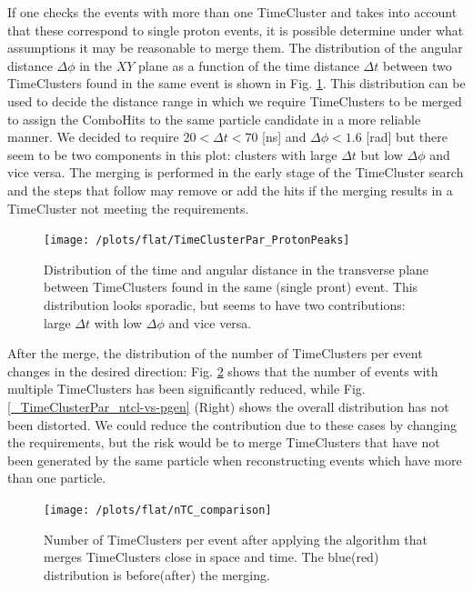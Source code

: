 \documentclass[12pt,a4paper,openright, oneside, titlepage]{book} %
\begin{document}
\noindent If one checks the events with more than one TimeCluster and takes into account that these correspond to single proton events, it is possible determine under what assumptions it may be reasonable to merge them. 
The distribution of the angular distance $\Delta \phi$ in the $XY$ plane as a function of the time distance $\Delta t$ between two TimeClusters found in the same event is shown in Fig. \ref{_TimeClusterPar_ProtonPeaks}. 
This distribution can be used to decide the distance range in which we require TimeClusters to be merged to assign the ComboHits to the same particle candidate in a more reliable manner. 
We decided to require $20<\Delta t<70$ [ns] and $\Delta \phi < 1.6$ [rad] but there seem to be two components in this plot: clusters with large $\Delta t$ but low $\Delta \phi$ and vice versa.
The merging is performed in the early stage of the TimeCluster search and the steps that follow may remove or add the hits if the merging results in a TimeCluster not meeting the requirements.

\begin{figure}[!htb]
\centering
\texttt{[image: /plots/flat/TimeClusterPar\_ProtonPeaks]}
\caption[TimeClusters distance in single particle event]{Distribution of the time and angular distance in the transverse plane 
between TimeClusters found in the same (single pront) event. 
This distribution looks sporadic, 
but seems to have two contributions: 
large $\Delta t$ with low $\Delta \phi$ and vice versa.}
\label{_TimeClusterPar_ProtonPeaks}
\end{figure}

\noindent After the merge, the distribution of the number of TimeClusters per event changes in the desired direction: 
Fig. \ref{_nTC_comparison} shows that the number of events with multiple TimeClusters has been significantly reduced, while Fig. \ref{_TimeClusterPar_ntcl-vs-pgen} (Right) shows the overall distribution has not been distorted.
We could reduce the contribution due to these cases by changing the requirements, but the risk would be to merge TimeClusters that have not been generated by the same particle when reconstructing events which have more than one particle.

\begin{figure}[!htb]
\centering
\texttt{[image: /plots/flat/nTC\_comparison]}
\caption[Number of TimeClusters pre-post merge]
{Number of TimeClusters per event after applying the algorithm 
that merges TimeClusters close in space and time. The blue(red) distribution
is before(after) the merging.}
\label{_nTC_comparison}
\end{figure}
\end{document}
